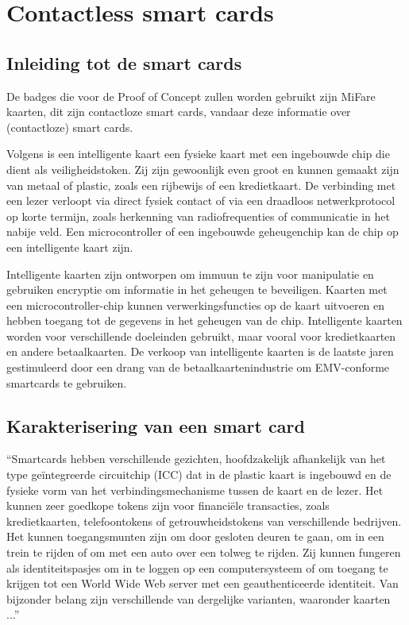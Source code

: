 \section{Contactless smart cards}
\subsection{Inleiding tot de smart cards}
De badges die voor de Proof of Concept zullen worden gebruikt zijn MiFare kaarten, dit zijn contactloze smart cards, vandaar deze informatie over (contactloze) smart cards.

Volgens \textcite{SwatiTawdeSmartCard} is een intelligente kaart een fysieke kaart met een ingebouwde chip die dient als veiligheidstoken. Zij zijn gewoonlijk even groot en kunnen gemaakt zijn van metaal of plastic, zoals een rijbewijs of een kredietkaart. De verbinding met een lezer verloopt via direct fysiek contact of via een draadloos netwerkprotocol op korte termijn, zoals herkenning van radiofrequenties of communicatie in het nabije veld. Een microcontroller of een ingebouwde geheugenchip kan de chip op een intelligente kaart zijn. 

Intelligente kaarten zijn ontworpen om immuun te zijn voor manipulatie en gebruiken encryptie om informatie in het geheugen te beveiligen. Kaarten met een microcontroller-chip kunnen verwerkingsfuncties op de kaart uitvoeren en hebben toegang tot de gegevens in het geheugen van de chip. Intelligente kaarten worden voor verschillende doeleinden gebruikt, maar vooral voor kredietkaarten en andere betaalkaarten. De verkoop van intelligente kaarten is de laatste jaren gestimuleerd door een drang van de betaalkaartenindustrie om EMV-conforme smartcards te gebruiken. 

\subsection{Karakterisering van een smart card}
``Smartcards hebben verschillende gezichten, hoofdzakelijk afhankelijk van het type geïntegreerde circuitchip (ICC) dat in de plastic kaart is ingebouwd en de fysieke vorm van het verbindingsmechanisme tussen de kaart en de lezer. Het kunnen zeer goedkope tokens zijn voor financiële transacties, zoals kredietkaarten, telefoontokens of getrouwheidstokens van verschillende bedrijven. Het kunnen toegangsmunten zijn om door gesloten deuren te gaan, om in een trein te rijden of om met een auto over een tolweg te rijden. Zij kunnen fungeren als identiteitspasjes om in te loggen op een computersysteem of om toegang te krijgen tot een World Wide Web server met een geauthenticeerde identiteit. Van bijzonder belang zijn verschillende van dergelijke varianten, waaronder kaarten ...''\autocite{OreillySmartCards}

